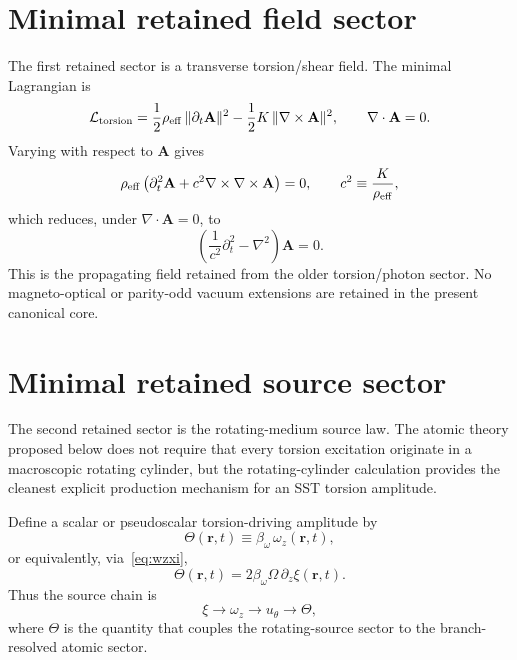 \documentclass[11pt,a4paper]{article}
\begin{document}
\section{Minimal retained field sector}
The first retained sector is a transverse torsion/shear field. The minimal Lagrangian is
\begin{equation}
\label{eq:Ltorsion}
\mathcal{L}_{\rm torsion}
=
\frac12\rho_{\rm eff}\,\lVert \partial_t \mathbf{A}\rVert^2
-
\frac12 K\,\lVert \nabla\times\mathbf{A}\rVert^2,
\qquad
\nabla\cdot\mathbf{A}=0.
\end{equation}
Varying with respect to $\mathbf{A}$ gives
\begin{equation}
\label{eq:Awave-pre}
\rho_{\rm eff}\left(\partial_t^2\mathbf{A}+c^2\nabla\times\nabla\times\mathbf{A}\right)=0,
\qquad
c^2\equiv \frac{K}{\rho_{\rm eff}},
\end{equation}
which reduces, under $\nabla\cdot\mathbf{A}=0$, to
\begin{equation}
\label{eq:Awave}
\boxed{
\left(\frac{1}{c^2}\partial_t^2-\nabla^2\right)\mathbf{A}=0.
}
\end{equation}
This is the propagating field retained from the older torsion/photon sector. No magneto-optical or parity-odd vacuum extensions are retained in the present canonical core.

\section{Minimal retained source sector}
The second retained sector is the rotating-medium source law. The atomic theory proposed below does not require that every torsion excitation originate in a macroscopic rotating cylinder, but the rotating-cylinder calculation provides the cleanest explicit production mechanism for an SST torsion amplitude.

Define a scalar or pseudoscalar torsion-driving amplitude by
\begin{equation}
\label{eq:ThetaDef}
\Theta(\mathbf{r},t) \equiv \beta_\omega\,\omega_z(\mathbf{r},t),
\end{equation}
or equivalently, via~\eqref{eq:wzxi},
\begin{equation}
\label{eq:ThetaXi}
\Theta(\mathbf{r},t)=2\beta_\omega\Omega\,\partial_z\xi(\mathbf{r},t).
\end{equation}
Thus the source chain is
\begin{equation}
\label{eq:source-chain}
\xi \longrightarrow \omega_z \longrightarrow u_\theta \longrightarrow \Theta,
\end{equation}
where $\Theta$ is the quantity that couples the rotating-source sector to the branch-resolved atomic sector.
\end{document}
